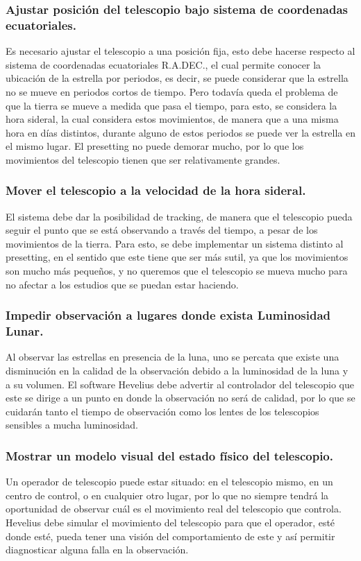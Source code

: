 \documentclass[letterpaper,spanish,10pt]{article}
\begin{document}
\subsubsection{Ajustar posici\'on del telescopio bajo sistema de coordenadas ecuatoriales.}
Es necesario ajustar el telescopio a una posición fija, esto debe hacerse respecto al sistema de coordenadas ecuatoriales R.A.DEC., el cual permite conocer la ubicación de la estrella por periodos, es decir, se puede considerar que la estrella no se mueve en periodos cortos de tiempo. Pero todavía queda el problema de que la tierra se mueve a medida que pasa el tiempo, para esto, se considera la hora sideral, la cual considera estos movimientos, de manera que a una misma hora en días distintos, durante alguno de estos periodos se puede ver la estrella en el mismo lugar. El presetting no puede demorar mucho, por lo que los movimientos del telescopio tienen que ser relativamente grandes.

\subsubsection{Mover el telescopio a la velocidad de la hora sideral.}
El sistema debe dar la posibilidad de tracking, de manera que el telescopio pueda seguir el punto que se está observando a través del tiempo, a pesar de los movimientos de la tierra. Para esto, se debe implementar un sistema distinto al presetting, en el sentido que este tiene que ser más sutil, ya que los movimientos son mucho más pequeños, y no queremos que el telescopio se mueva mucho para no afectar a los estudios que se puedan estar haciendo.

\subsubsection{Impedir observaci\'on a lugares donde exista Luminosidad Lunar.}
Al observar las estrellas en presencia de la luna, uno se percata que existe una disminución en la calidad de la observación debido a la luminosidad de la luna y a su volumen. El software Hevelius debe advertir al controlador del telescopio que este se dirige a un punto en donde la observación no será de calidad, por lo que se cuidarán tanto el tiempo de observación como los lentes de los telescopios sensibles a mucha luminosidad.

\subsubsection{Mostrar un modelo visual del estado f\'isico del telescopio.}
Un operador de telescopio puede estar situado: en el telescopio mismo, en un centro de control, o en cualquier otro lugar, por lo que no siempre tendrá la oportunidad de observar cuál es el movimiento real del telescopio que controla. Hevelius debe simular el movimiento del telescopio para que el operador, esté donde esté, pueda tener una visión del comportamiento de este y así permitir diagnosticar alguna falla en la observación.
\end{document}
